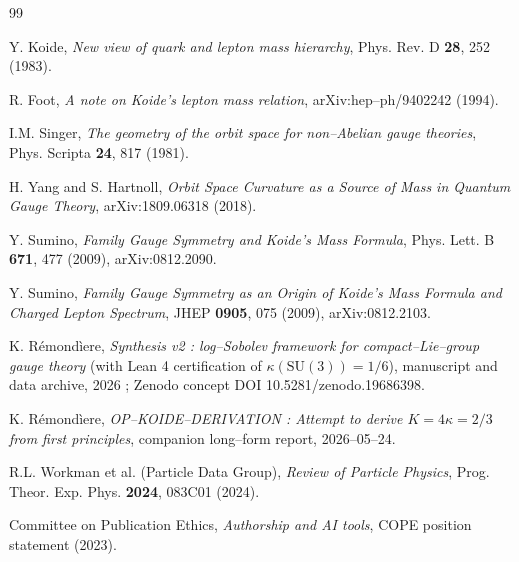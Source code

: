 \documentclass[11pt,a4paper]{article}
\theoremstyle{remark}
\begin{document}
\begin{thebibliography}{99}

 Y. Koide, \emph{New view of quark and lepton mass hierarchy}, Phys. Rev. D \textbf{28}, 252 (1983).

 R. Foot, \emph{A note on Koide's lepton mass relation}, arXiv:hep--ph/9402242 (1994).

 I.M. Singer, \emph{The geometry of the orbit space for non--Abelian gauge theories}, Phys. Scripta \textbf{24}, 817 (1981).

 H. Yang and S. Hartnoll, \emph{Orbit Space Curvature as a Source of Mass in Quantum Gauge Theory}, arXiv:1809.06318 (2018).

 Y. Sumino, \emph{Family Gauge Symmetry and Koide's Mass Formula}, Phys. Lett. B \textbf{671}, 477 (2009), arXiv:0812.2090.

 Y. Sumino, \emph{Family Gauge Symmetry as an Origin of Koide's Mass Formula and Charged Lepton Spectrum}, JHEP \textbf{0905}, 075 (2009), arXiv:0812.2103.

 K. R\'emond\`iere, \emph{Synthesis v2 : log--Sobolev framework for compact--Lie--group gauge theory} (with Lean 4 certification of $\kappa(\mathrm{SU}(3)) = 1/6$), manuscript and data archive, 2026 ; Zenodo concept DOI 10.5281/zenodo.19686398.

 K. R\'emond\`iere, \emph{OP--KOIDE--DERIVATION : Attempt to derive $K = 4\kappa = 2/3$ from first principles}, companion long--form report, 2026--05--24.

 R.L. Workman et al. (Particle Data Group), \emph{Review of Particle Physics}, Prog. Theor. Exp. Phys. \textbf{2024}, 083C01 (2024).

 Committee on Publication Ethics, \emph{Authorship and AI tools}, COPE position statement (2023).

\end{thebibliography}
\end{document}
